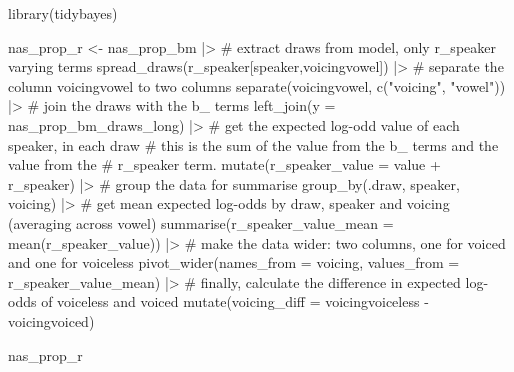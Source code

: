 \documentclass[
  authoryear,
  preprint,
  3p]{elsarticle}
\newenvironment{Shaded}{\begin{snugshade}}{\end{snugshade}}
\newcommand{\AttributeTok}[1]{\textcolor[rgb]{0.40,0.45,0.13}{#1}}
\newcommand{\CommentTok}[1]{\textcolor[rgb]{0.37,0.37,0.37}{#1}}
\newcommand{\FunctionTok}[1]{\textcolor[rgb]{0.28,0.35,0.67}{#1}}
\newcommand{\NormalTok}[1]{\textcolor[rgb]{0.00,0.23,0.31}{#1}}
\newcommand{\OtherTok}[1]{\textcolor[rgb]{0.00,0.23,0.31}{#1}}
\newcommand{\SpecialCharTok}[1]{\textcolor[rgb]{0.37,0.37,0.37}{#1}}
\newcommand{\StringTok}[1]{\textcolor[rgb]{0.13,0.47,0.30}{#1}}
\begin{document}
\begin{Shaded}
\begin{Highlighting}[]
\FunctionTok{library}\NormalTok{(tidybayes)}

\NormalTok{nas\_prop\_r }\OtherTok{\textless{}{-}}\NormalTok{ nas\_prop\_bm }\SpecialCharTok{|\textgreater{}} 
  \CommentTok{\# extract draws from model, only \textasciigrave{}r\_speaker\textasciigrave{} varying terms}
  \FunctionTok{spread\_draws}\NormalTok{(r\_speaker[speaker,voicingvowel]) }\SpecialCharTok{|\textgreater{}} 
  \CommentTok{\# separate the column voicingvowel to two columns}
  \FunctionTok{separate}\NormalTok{(voicingvowel, }\FunctionTok{c}\NormalTok{(}\StringTok{"voicing"}\NormalTok{, }\StringTok{"vowel"}\NormalTok{)) }\SpecialCharTok{|\textgreater{}} 
  \CommentTok{\# join the draws with the \textasciigrave{}b\_\textasciigrave{} terms}
  \FunctionTok{left\_join}\NormalTok{(}\AttributeTok{y =}\NormalTok{ nas\_prop\_bm\_draws\_long) }\SpecialCharTok{|\textgreater{}} 
  \CommentTok{\# get the expected log{-}odd value of each speaker, in each draw}
  \CommentTok{\# this is the sum of the \textasciigrave{}value\textasciigrave{} from the b\_ terms and the value from the}
  \CommentTok{\# r\_speaker term.}
  \FunctionTok{mutate}\NormalTok{(}\AttributeTok{r\_speaker\_value =}\NormalTok{ value }\SpecialCharTok{+}\NormalTok{ r\_speaker) }\SpecialCharTok{|\textgreater{}} 
  \CommentTok{\# group the data for summarise}
  \FunctionTok{group\_by}\NormalTok{(.draw, speaker, voicing) }\SpecialCharTok{|\textgreater{}} 
  \CommentTok{\# get mean expected log{-}odds by draw, speaker and voicing (averaging across vowel)}
  \FunctionTok{summarise}\NormalTok{(}\AttributeTok{r\_speaker\_value\_mean =} \FunctionTok{mean}\NormalTok{(r\_speaker\_value)) }\SpecialCharTok{|\textgreater{}} 
  \CommentTok{\# make the data wider: two columns, one for voiced and one for voiceless}
  \FunctionTok{pivot\_wider}\NormalTok{(}\AttributeTok{names\_from =}\NormalTok{ voicing, }\AttributeTok{values\_from =}\NormalTok{ r\_speaker\_value\_mean) }\SpecialCharTok{|\textgreater{}} 
  \CommentTok{\# finally, calculate the difference in expected log{-}odds of voiceless and voiced}
  \FunctionTok{mutate}\NormalTok{(}\AttributeTok{voicing\_diff =}\NormalTok{ voicingvoiceless }\SpecialCharTok{{-}}\NormalTok{ voicingvoiced)}

\NormalTok{nas\_prop\_r}
\end{Highlighting}
\end{Shaded}
\end{document}

